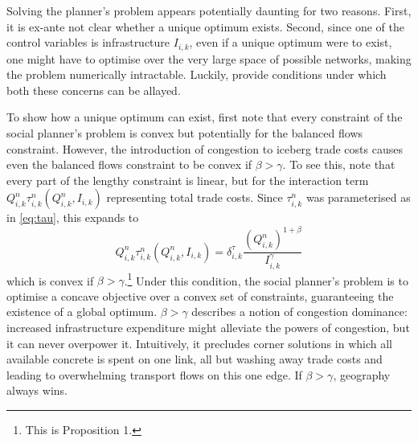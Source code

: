 \documentclass[11pt, oneside]{article}   	%
\begin{document}
Solving the planner's problem appears potentially daunting for two reasons. First, it is ex-ante not clear whether a unique optimum exists. Second, since one of the control variables is infrastructure $I_{i,k}$, even if a unique optimum were to exist, one might have to optimise over the very large space of possible networks, making the problem numerically intractable. Luckily, \cite{fajgelbaum_optimal_2017} provide conditions under which both these concerns can be allayed.

To show how a unique optimum can exist, first note that every constraint of the social planner's problem is convex but potentially for the balanced flows constraint. However, the introduction of congestion to iceberg trade costs causes even the balanced flows constraint to be convex if $\beta > \gamma$. To see this, note that every part of the lengthy constraint is linear, but for the interaction term $Q_{i,k}^{n}\tau_{i,k}^{n}(Q_{i,k}^{n}, I_{i,k})$ representing total trade costs. Since $\tau_{i,k}^{n}$ was parameterised as in \eqref{eq:tau}, this expands to
\begin{equation}
  Q_{i,k}^{n}\tau_{i,k}^{n}(Q_{i,k}^{n}, I_{i,k}) = \delta^{\tau}_{i,k} \frac{(Q_{i,k}^{n})^{1+\beta}}{I_{i,k}^{\gamma}}
\end{equation}
which is convex if $\beta > \gamma$.\footnote{This is \citeauthor{fajgelbaum_optimal_2017} Proposition 1.} Under this condition, the social planner's problem is to optimise a concave objective over a convex set of constraints, guaranteeing the existence of a global optimum. $\beta > \gamma$ describes a notion of congestion dominance: increased infrastructure expenditure might alleviate the powers of congestion, but it can never overpower it. Intuitively, it precludes corner solutions in which all available concrete is spent on one link, all but washing away trade costs and leading to overwhelming transport flows on this one edge. If $\beta > \gamma$, geography always wins.
\end{document}
